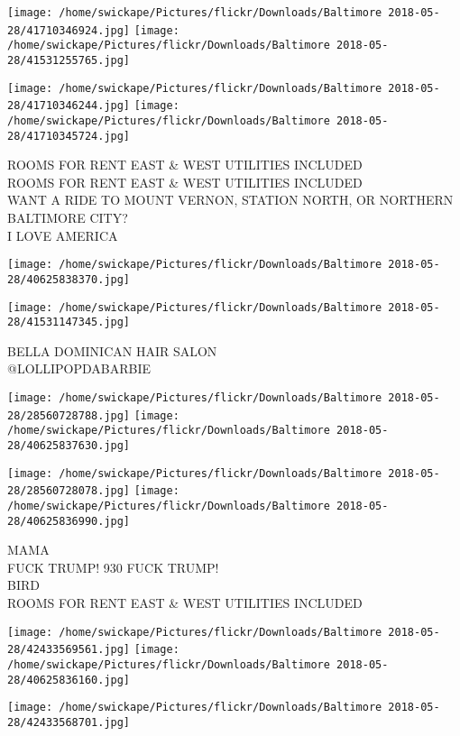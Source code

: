 \documentclass[10pt,letterpaper]{article}
\begin{document}
\texttt{[image: /home/swickape/Pictures/flickr/Downloads/Baltimore 2018-05-28/41710346924.jpg]}
\texttt{[image: /home/swickape/Pictures/flickr/Downloads/Baltimore 2018-05-28/41531255765.jpg]}

\texttt{[image: /home/swickape/Pictures/flickr/Downloads/Baltimore 2018-05-28/41710346244.jpg]}
\texttt{[image: /home/swickape/Pictures/flickr/Downloads/Baltimore 2018-05-28/41710345724.jpg]}

ROOMS FOR RENT EAST \& WEST UTILITIES INCLUDED\\
ROOMS FOR RENT EAST \& WEST UTILITIES INCLUDED\\
WANT A RIDE TO MOUNT VERNON, STATION NORTH, OR NORTHERN BALTIMORE CITY?\\
I LOVE AMERICA\\
\pagebreak

\texttt{[image: /home/swickape/Pictures/flickr/Downloads/Baltimore 2018-05-28/40625838370.jpg]}

\vspace{0.25in}
\texttt{[image: /home/swickape/Pictures/flickr/Downloads/Baltimore 2018-05-28/41531147345.jpg]}

BELLA DOMINICAN HAIR SALON\\
@LOLLIPOPDABARBIE\\
\pagebreak

\texttt{[image: /home/swickape/Pictures/flickr/Downloads/Baltimore 2018-05-28/28560728788.jpg]}
\texttt{[image: /home/swickape/Pictures/flickr/Downloads/Baltimore 2018-05-28/40625837630.jpg]}

\texttt{[image: /home/swickape/Pictures/flickr/Downloads/Baltimore 2018-05-28/28560728078.jpg]}
\texttt{[image: /home/swickape/Pictures/flickr/Downloads/Baltimore 2018-05-28/40625836990.jpg]}

MAMA\\
FUCK TRUMP!  930 FUCK TRUMP!\\
BIRD\\
ROOMS FOR RENT EAST \& WEST UTILITIES INCLUDED\\
\pagebreak

\texttt{[image: /home/swickape/Pictures/flickr/Downloads/Baltimore 2018-05-28/42433569561.jpg]}
\texttt{[image: /home/swickape/Pictures/flickr/Downloads/Baltimore 2018-05-28/40625836160.jpg]}

\vspace{0.25in}
\texttt{[image: /home/swickape/Pictures/flickr/Downloads/Baltimore 2018-05-28/42433568701.jpg]}
\end{document}

